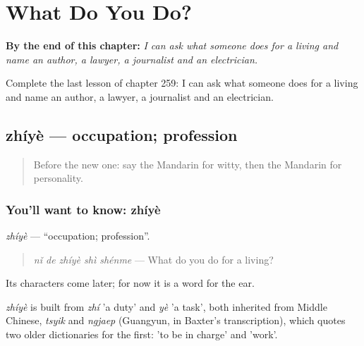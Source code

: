 
\chapter{What Do You Do?}
\label{ch:zh-what-do-you-do}

\begin{chapteropening}
\textbf{By the end of this chapter:} \emph{I can ask what someone does for a living and name an author, a lawyer, a journalist and an electrician.}

Complete the last lesson of chapter 259: I can ask what someone does for a living and name an author, a lawyer, a journalist and an electrician.
\end{chapteropening}

\section[zhíyè]{zhíyè — occupation; profession}

\label{lesson:ZH-C259-zhiye}



\begin{quote}
Before the new one: say the Mandarin for witty, then the Mandarin for personality.
\end{quote}

\subsection*{You'll want to know: zhíyè}
\emph{zhíyè} — \textquotedblleft{}occupation; profession\textquotedblright{}.

\begin{quote}
\emph{nǐ de zhíyè shì shénme} — What do you do for a living?
\end{quote}

Its characters come later; for now it is a word for the ear.

\begin{cousinweb}
\emph{zhíyè} is built from \emph{zhí} 'a duty' and \emph{yè} 'a task', both inherited from Middle Chinese, \emph{tsyik} and \emph{ngjaep} (Guangyun, in Baxter's transcription), which quotes two older dictionaries for the first: 'to be in charge' and 'work'.
\end{cousinweb}

